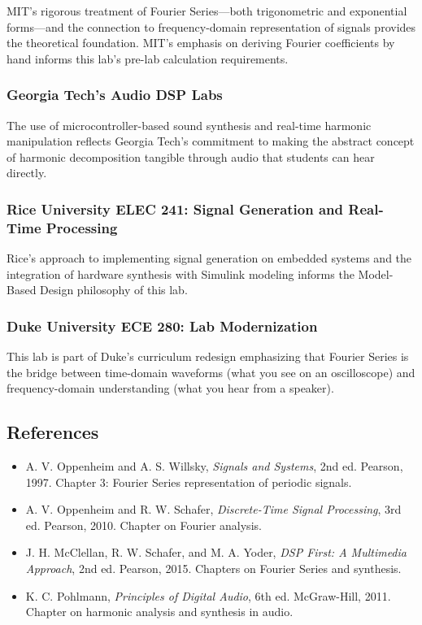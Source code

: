 \documentclass[11pt,letterpaper]{article}
\begin{document}
MIT's rigorous treatment of Fourier Series—both trigonometric and exponential forms—and the connection to frequency-domain representation of signals provides the theoretical foundation. MIT's emphasis on deriving Fourier coefficients by hand informs this lab's pre-lab calculation requirements.

\subsubsection*{Georgia Tech's Audio DSP Labs}

The use of microcontroller-based sound synthesis and real-time harmonic manipulation reflects Georgia Tech's commitment to making the abstract concept of harmonic decomposition tangible through audio that students can hear directly.

\subsubsection*{Rice University ELEC 241: Signal Generation and Real-Time Processing}

Rice's approach to implementing signal generation on embedded systems and the integration of hardware synthesis with Simulink modeling informs the Model-Based Design philosophy of this lab.

\subsubsection*{Duke University ECE 280: Lab Modernization}

This lab is part of Duke's curriculum redesign emphasizing that Fourier Series is the bridge between time-domain waveforms (what you see on an oscilloscope) and frequency-domain understanding (what you hear from a speaker).

\subsection*{References}

\begin{itemize}
    \item A. V. Oppenheim and A. S. Willsky, \textit{Signals and Systems}, 2nd ed. Pearson, 1997. Chapter 3: Fourier Series representation of periodic signals.
    \item A. V. Oppenheim and R. W. Schafer, \textit{Discrete-Time Signal Processing}, 3rd ed. Pearson, 2010. Chapter on Fourier analysis.
    \item J. H. McClellan, R. W. Schafer, and M. A. Yoder, \textit{DSP First: A Multimedia Approach}, 2nd ed. Pearson, 2015. Chapters on Fourier Series and synthesis.
    \item K. C. Pohlmann, \textit{Principles of Digital Audio}, 6th ed. McGraw-Hill, 2011. Chapter on harmonic analysis and synthesis in audio.
\end{itemize}
\end{document}
